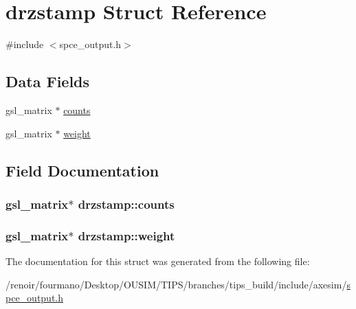 \hypertarget{structdrzstamp}{
\section{drzstamp Struct Reference}
\label{structdrzstamp}
}


{\ttfamily \#include $<$spce\_\-output.h$>$}\subsection*{Data Fields}
\begin{DoxyCompactItemize}
\item 
gsl\_\-matrix $\ast$ \hyperlink{structdrzstamp_a1e8778c4fa3383cb553fbfd9d6eb2582}{counts}
\item 
gsl\_\-matrix $\ast$ \hyperlink{structdrzstamp_a175c8d689fec7a99909d3df716891907}{weight}
\end{DoxyCompactItemize}


\subsection{Field Documentation}
\hypertarget{structdrzstamp_a1e8778c4fa3383cb553fbfd9d6eb2582}{
\subsubsection[{counts}]{\setlength{\rightskip}{0pt plus 5cm}gsl\_\-matrix$\ast$ {\bf drzstamp::counts}}}
\label{structdrzstamp_a1e8778c4fa3383cb553fbfd9d6eb2582}
\hypertarget{structdrzstamp_a175c8d689fec7a99909d3df716891907}{
\subsubsection[{weight}]{\setlength{\rightskip}{0pt plus 5cm}gsl\_\-matrix$\ast$ {\bf drzstamp::weight}}}
\label{structdrzstamp_a175c8d689fec7a99909d3df716891907}


The documentation for this struct was generated from the following file:\begin{DoxyCompactItemize}
\item 
/renoir/fourmano/Desktop/OUSIM/TIPS/branches/tips\_\-build/include/axesim/\hyperlink{spce__output_8h}{spce\_\-output.h}\end{DoxyCompactItemize}
